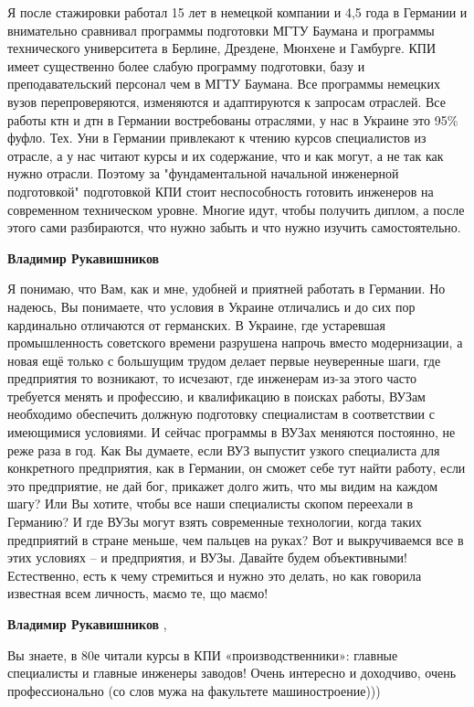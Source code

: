 \begin{itemize}
\begin{itemize}
\begin{itemize}
Я после стажировки работал 15 лет в немецкой компании и 4,5 года в Германии и
внимательно сравнивал программы подготовки МГТУ Баумана и программы
технического университета в Берлине, Дрездене, Мюнхене и Гамбурге. КПИ имеет
существенно более слабую программу подготовки, базу и преподавательский
персонал чем в МГТУ Баумана. Все программы немецких вузов перепроверяются,
изменяются и адаптируются к запросам отраслей. Все работы ктн и дтн в Германии
востребованы отраслями, у нас в Украине это 95\% фуфло. Тех. Уни в Германии
привлекают к чтению курсов специалистов из отрасле, а у нас читают курсы и их
содержание, что и как могут, а не так как нужно отрасли. Поэтому за
"фундаментальной начальной инженерной подготовкой" подготовкой КПИ стоит
неспособность готовить инженеров на современном техническом уровне. Многие
идут, чтобы получить диплом, а после этого сами разбираются, что нужно забыть и
что нужно изучить самостоятельно.


\textbf{Владимир Рукавишников}

Я понимаю, что Вам, как и мне, удобней и приятней работать в Германии. Но
надеюсь, Вы понимаете, что условия в Украине отличались и до сих пор
кардинально отличаются от германских. В Украине, где устаревшая промышленность
советского времени разрушена напрочь вместо модернизации, а новая ещё только с
большущим трудом делает первые неуверенные шаги, где предприятия то возникают,
то исчезают, где инженерам из-за этого часто требуется менять и профессию, и
квалификацию в поисках работы, ВУЗам необходимо обеспечить должную подготовку
специалистам в соответствии с имеющимися условиями. И сейчас программы в ВУЗах
меняются постоянно, не реже раза в год. Как Вы думаете, если ВУЗ выпустит
узкого специалиста для конкретного предприятия, как в Германии, он сможет себе
тут найти работу, если это предприятие, не дай бог, прикажет долго жить, что мы
видим на каждом шагу? Или Вы хотите, чтобы все наши специалисты скопом
переехали в Германию? И где ВУЗы могут взять современные технологии, когда
таких предприятий в стране меньше, чем пальцев на руках? Вот и выкручиваемся
все в этих условиях – и предприятия, и ВУЗы. Давайте будем объективными!
Естественно, есть к чему стремиться и нужно это делать, но как говорила
известная всем личность, маємо те, що маємо!


\textbf{Владимир Рукавишников} , 

Вы знаете, в 80е читали курсы в КПИ «производственники»: главные специалисты и
главные инженеры заводов! Очень интересно и доходчиво, очень профессионально
(со слов мужа на факультете машиностроение)))



\end{itemize}
\end{itemize}
\end{itemize}
